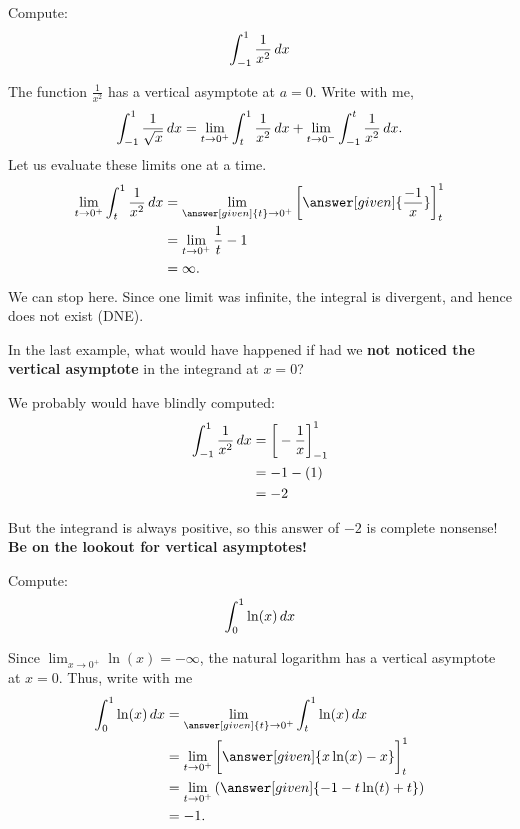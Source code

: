 \documentclass{ximera}
\begin{document}
\begin{example}	
  Compute:
  \[
  \int_{-1}^1 \frac{1}{x^2} \mathop{}\!d x
  \]
  \begin{explanation}
    The function $\frac{1}{x^2}$ has a vertical asymptote at $a=0$.
    Write with me,
  \[
  \int_{-1}^1 \frac{1}{\sqrt{x}} \mathop{}\!d x = \lim_{t \to 0^+} \int_{t}^1 \frac{1}{x^2} \mathop{}\!d x  + \lim_{t \to 0^-} \int_{-1}^t \frac{1}{x^2} \mathop{}\!d x.
  \]  
  Let us evaluate these limits one at a time.
  \begin{align*}
    \lim_{t \to 0^+} \int_{t}^1 \frac{1}{x^2} \d x  &=  \lim_{\answer[given]{t} \to 0^+} \eval{\answer[given]{\frac{-1}{x}}}_t^1 \\
    &=  \lim_{t \to 0^+} \frac{1}{t}-1\\
    &= \infty.
  \end{align*}
    We can stop here. Since one limit was infinite, the integral is
    divergent, and hence does not exist (DNE).
  \end{explanation}
\end{example}

\begin{warning}
In the last example, what would have happened if had we \textbf{not
  noticed the vertical asymptote} in the integrand at $x=0$?

We probably would have blindly computed:
\begin{align*}
  \int_{-1}^1\frac1{x^2}\mathop{}\!d x &= \bigg[ -\frac{1}{x} \bigg]_{-1}^1\\
  &= -1 - (1)\\
  &=-2
\end{align*}

But the integrand is always positive, so this answer of $-2$ is
complete nonsense! \textbf{Be on the lookout for vertical asymptotes!}
\end{warning}


\begin{example}
  Compute:
  \[
  \int_0^1 \ln(x)\mathop{}\!d x
  \]
  \begin{explanation}
    Since $\lim_{x\to 0^+} \ln(x) = -\infty$, the natural logarithm
    has a vertical asymptote at $x = 0$. Thus, write with me
    \begin{align*}
    \int_0^1 \ln(x) \d x &=\lim_{\answer[given]{t}\to 0^+} \int_t^1 \ln(x) \d x \\
    &= \lim_{t\to 0^+} \eval{\answer[given]{x \ln(x)-x}}_t^1 \\
    &= \lim_{t\to 0^+} \left(\answer[given]{-1 -t \ln(t) +t}\right) \\
    &= -1.
    \end{align*}
  \end{explanation}
\end{example}
\end{document}
